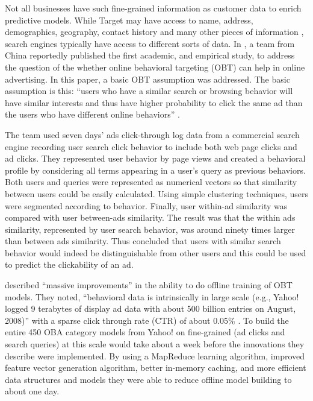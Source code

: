 Not all businesses have such fine-grained information as customer data to enrich predictive models. While Target may have access to name, address, demographics, geography, contact history and many other pieces of information  \citep{HowTargetGetsthe:2010wu},  search engines typically have access to different sorts of data. In  \cite*{Yan:2009dk},  a team from China reportedly published the first academic, and empirical study, to address the question of the whether online behavioral targeting (OBT) can help in online advertising. In this paper, a basic OBT assumption was addressed. The basic assumption is this: ``users who have a similar search or browsing behavior will have similar interests and thus have higher probability to click the same ad than the users who have different online behaviors''  \citep{Yan:2009dk}.  

The team used seven days' ads click-through log data from a commercial search engine recording user search click behavior to include both web page clicks and ad clicks. They represented user behavior by page views and created a behavioral profile by considering all terms appearing in a user's query as previous behaviors. Both users and queries were represented as numerical vectors so that similarity between users could be easily calculated. Using simple clustering techniques, users were segmented according to behavior. Finally, user within-ad similarity was compared with user between-ads similarity. The result was that the within ads similarity, represented by user search behavior, was around ninety times larger than between ads similarity. Thus  \cite*{Yan:2009dk}  concluded that users with similar search behavior would indeed be distinguishable from other users and this could be used to predict the clickability of an ad.

 \cite*{Chen:2009jb}  described ``massive improvements'' in the ability to do offline training of OBT models. They noted, ``behavioral data is intrinsically in large scale (e.g., Yahoo! logged 9 terabytes of display ad data with about 500 billion entries on August, 2008)'' with a sparse click through rate (CTR) of about 0.05\%  \citep{Chen:2009jb}.  To build the entire 450 OBA category models from Yahoo! on fine-grained (ad clicks and search queries) at this scale would take about a week before the innovations they describe were implemented. By using a MapReduce learning algorithm, improved feature vector generation algorithm, better in-memory caching, and more efficient data structures and models they were able to reduce offline model building to about one day.

